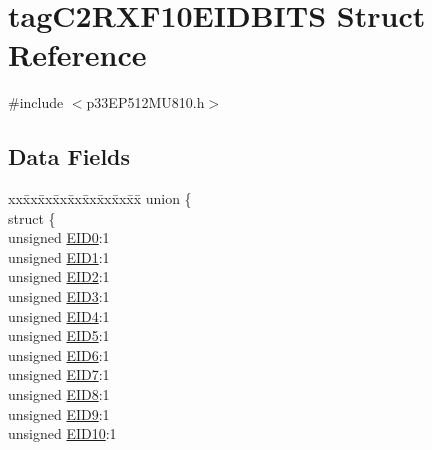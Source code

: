 \hypertarget{structtag_c2_r_x_f10_e_i_d_b_i_t_s}{}\section{tag\+C2\+R\+X\+F10\+E\+I\+D\+B\+I\+TS Struct Reference}
\label{structtag_c2_r_x_f10_e_i_d_b_i_t_s}


{\ttfamily \#include $<$p33\+E\+P512\+M\+U810.\+h$>$}

\subsection*{Data Fields}
\begin{DoxyCompactItemize}
\item 
\begin{tabbing}
xx\=xx\=xx\=xx\=xx\=xx\=xx\=xx\=xx\=\kill
union \{\\
\>struct \{\\
\>\>unsigned \hyperlink{structtag_c2_r_x_f10_e_i_d_b_i_t_s_a9da8b7b30247e4f9cd8cc056549aa9fd}{EID0}:1\\
\>\>unsigned \hyperlink{structtag_c2_r_x_f10_e_i_d_b_i_t_s_afd6c139491d147c1262f3d051c6691e9}{EID1}:1\\
\>\>unsigned \hyperlink{structtag_c2_r_x_f10_e_i_d_b_i_t_s_a36ec62d8d3c5acd5d15e6691dc099a94}{EID2}:1\\
\>\>unsigned \hyperlink{structtag_c2_r_x_f10_e_i_d_b_i_t_s_ab895f7d0ac289a0383b607cbc62eebe2}{EID3}:1\\
\>\>unsigned \hyperlink{structtag_c2_r_x_f10_e_i_d_b_i_t_s_a136d5a709d6618d40acceccb43036656}{EID4}:1\\
\>\>unsigned \hyperlink{structtag_c2_r_x_f10_e_i_d_b_i_t_s_a8dffb2d86a6c184df505ae7c71a58710}{EID5}:1\\
\>\>unsigned \hyperlink{structtag_c2_r_x_f10_e_i_d_b_i_t_s_af8a8574102515d8f1a4b7fd1685d0532}{EID6}:1\\
\>\>unsigned \hyperlink{structtag_c2_r_x_f10_e_i_d_b_i_t_s_a84c3262e67f8d5fd387ac10bde6fa9b1}{EID7}:1\\
\>\>unsigned \hyperlink{structtag_c2_r_x_f10_e_i_d_b_i_t_s_acca25e0b7d86eb499d01f85222baea87}{EID8}:1\\
\>\>unsigned \hyperlink{structtag_c2_r_x_f10_e_i_d_b_i_t_s_ac6748f73d4ada8538b06548be4f396c2}{EID9}:1\\
\>\>unsigned \hyperlink{structtag_c2_r_x_f10_e_i_d_b_i_t_s_a9cea8e77ecbb72bd3b08102412793725}{EID10}:1\\

\end{tabbing}
\end{DoxyCompactItemize}
